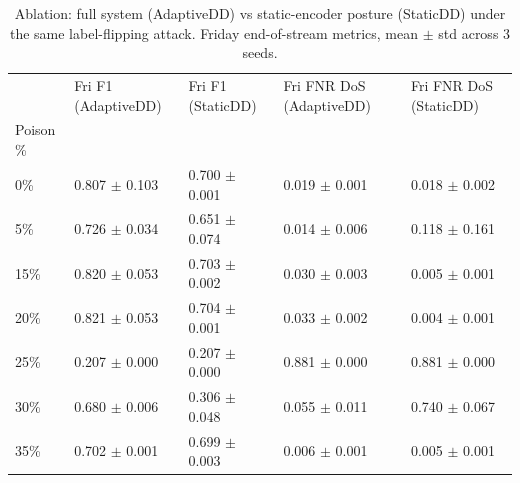 \begin{table}
\caption{Ablation: full system (AdaptiveDD) vs static-encoder posture (StaticDD) under the same label-flipping attack. Friday end-of-stream metrics, mean $\pm$ std across 3 seeds.}
\label{tab:ablation-encoder}
\begin{tabular}{lllll}
\toprule
 & Fri F1 (AdaptiveDD) & Fri F1 (StaticDD) & Fri FNR DoS (AdaptiveDD) & Fri FNR DoS (StaticDD) \\
Poison \% &  &  &  &  \\
\midrule
0\% & 0.807 $\pm$ 0.103 & 0.700 $\pm$ 0.001 & 0.019 $\pm$ 0.001 & 0.018 $\pm$ 0.002 \\
5\% & 0.726 $\pm$ 0.034 & 0.651 $\pm$ 0.074 & 0.014 $\pm$ 0.006 & 0.118 $\pm$ 0.161 \\
15\% & 0.820 $\pm$ 0.053 & 0.703 $\pm$ 0.002 & 0.030 $\pm$ 0.003 & 0.005 $\pm$ 0.001 \\
20\% & 0.821 $\pm$ 0.053 & 0.704 $\pm$ 0.001 & 0.033 $\pm$ 0.002 & 0.004 $\pm$ 0.001 \\
25\% & 0.207 $\pm$ 0.000 & 0.207 $\pm$ 0.000 & 0.881 $\pm$ 0.000 & 0.881 $\pm$ 0.000 \\
30\% & 0.680 $\pm$ 0.006 & 0.306 $\pm$ 0.048 & 0.055 $\pm$ 0.011 & 0.740 $\pm$ 0.067 \\
35\% & 0.702 $\pm$ 0.001 & 0.699 $\pm$ 0.003 & 0.006 $\pm$ 0.001 & 0.005 $\pm$ 0.001 \\
\bottomrule
\end{tabular}
\end{table}
